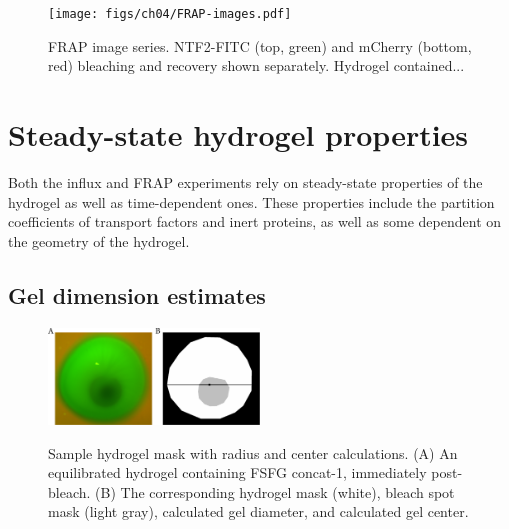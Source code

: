 \begin{figure} 
\caption{FRAP image series. NTF2-FITC (top, green) and mCherry (bottom, red) bleaching and recovery shown separately.  Hydrogel contained... }
\centering
\texttt{[image: figs/ch04/FRAP-images.pdf]}
\label{fig:frap-images}
\end{figure} 

\section{Steady-state hydrogel properties}

Both the influx and FRAP experiments rely on steady-state properties of the hydrogel as well as time-dependent ones.  These properties include the partition coefficients of transport factors and inert proteins, as well as some dependent on the geometry of the hydrogel.

\subsection{Gel dimension estimates}
\label{sec:gel-dim}

\begin{figure} 
\caption{Sample hydrogel mask with radius and center calculations.  (A) An equilibrated hydrogel containing FSFG concat-1, immediately post-bleach. (B) The corresponding hydrogel mask (white), bleach spot mask (light gray), calculated gel diameter, and calculated gel center.}
\centering
\includegraphics[width=0.5\textwidth]{figs/ch04/geometry.pdf}
\label{fig:masks}
\end{figure} 

